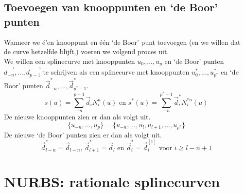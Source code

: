 \documentclass[notities.tex]{subfiles}
\begin{document}
\subsection{Toevoegen van knooppunten en `de Boor' punten}
Wanneer we \'e'en knooppunt en \'e\'en `de Boor' punt toevoegen (en we willen dat de curve hetzelfde blijft,) voeren we volgend proces uit.\\
We willen een splinecurve met knooppunten $u_0,...,u_p$ en `de Boor' punten $\vec{d_{-n}},...,\vec{d_{p-1}}$ te schrijven als een splinecurve met knooppunten $u^{*}_0,...,u^{*}_{p^{*}}$ en `de Boor' punten $\vec{d}_{-n}^{*},...,\vec{d}_{p^{*}-1}^{*}$.
\[
s(u) = \sum_{-n}^{p-1}\vec{d}_iN_{i}^{n}(u) \text{ en } s^{*}(u) = \sum_{-n}^{p^{*}-1}\vec{d}^{*}_iN_{i}^{*n}(u) 
\]
De nieuwe knooppunten zien er dan als volgt uit.
\[
\{u_{-n},...,u_{p}\}
= \{u_{-n},...,u_{l},u_{l+1},...,u_{p^{*}}\} 
\]
De nieuwe `de Boor' punten zien er dan als volgt uit.
\[
\vec{d}_{l-n}^{*} = \vec{d}_{l-n} \text{, } \vec{d}_{l+1}^{*} = \vec{d}_{l}\text{ en } \vec{d}_{i}^{*} = \vec{d}_{i}^{[1]} \text{ voor } i\ge l-n+1
\]

\section{NURBS: rationale splinecurven}
\end{document}
